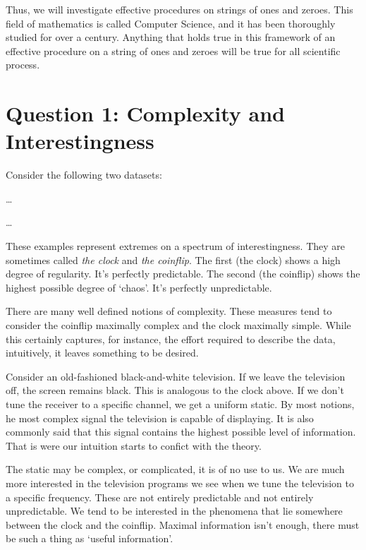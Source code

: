 \documentclass{article}
\begin{document}
Thus, we will investigate effective procedures on strings of ones and zeroes. This field of mathematics is called Computer Science, and it has been thoroughly studied for over a century. Anything that holds true in this framework of an effective procedure on a string of ones and zeroes will be true for all scientific process.

\pagebreak[0]

\section*{{\sc Question 1}: Complexity and Interestingness}

Consider the  following two datasets:
\begin{center}
\ldots

\ldots

\end{center}
These examples represent extremes on a spectrum of interestingness. They are
sometimes called \emph{the clock} and \emph{the coinflip}. The first (the clock)
shows a high degree of regularity. It's perfectly predictable. The second
(the coinflip) shows the highest possible degree of `chaos'. It's perfectly
unpredictable.

There are many well defined notions of complexity. These measures tend to
consider the coinflip maximally complex and the clock maximally simple. While 
this certainly captures, for instance, the effort required to describe the data,
intuitively, it leaves something to be desired.

Consider an old-fashioned black-and-white television. If we leave the
television off, the screen remains black. This is analogous to the clock above.
If we don't tune the receiver to a specific channel, we get a uniform static. By
most notions, he most complex signal the television is capable of displaying. It
is also commonly said that this signal contains the highest possible level of
information. That is were our intuition starts to confict with the theory.

The static may be complex, or complicated, it is of no use to us. We are
much more interested in the television programs we see when we tune the
television to a specific frequency. These are not entirely predictable and not
entirely unpredictable. We tend to be interested in the phenomena that lie somewhere
between the clock and the coinflip. Maximal information isn't enough, there must
be such a thing as `useful information'.
\end{document}
